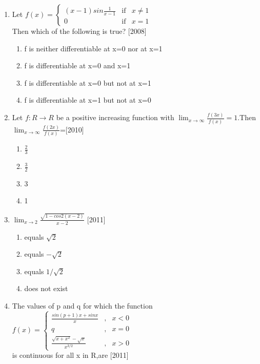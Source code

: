 \documentclass[journal,12pt,twocolumn]{IEEEtran}
\theoremstyle{remark}
\begin{document}
\begin{enumerate}
    \begin{enumerate}
        \item 0\item1\item 2\item -1
    \end{enumerate}
    \item[(25)] Let $f(x)= \left\{ \begin{array}{rcl}
(x-1)sin\frac{1}{x-1} & \mbox{if}
& x\neq 1 \\ 0 & \mbox{if} & x=1
\end{array}\right. $ \\Then which of the following is true? \hfill[2008]
    \begin{enumerate}
        \item f is neither differentiable at x=0 nor at x=1\item f is differentiable at x=0 and x=1\item f is differentiable at x=0 but not at x=1\item f is differentiable at x=1 but not at x=0
    \end{enumerate}
    \item[(26)] Let $f:R\rightarrow R$ be a positive increasing function with
    $\displaystyle \lim_{x\to\infty} \frac{f(3x)}{f(x)}=1 $.Then $\displaystyle \lim_{x\to\infty} \frac{f(2x)}{f(x)}$=\hfill[2010]
    \begin{enumerate}
     \item $\frac{2}{3}$ \item $\frac{3}{2}$ \item3 \item1
    \end{enumerate}
     \item[(27)]  $\displaystyle \lim_{x\to 2} \frac{\sqrt{1-cos{2(x-2)}}}{x-2} $ \hfill[2011]
    \begin{enumerate}
        \item equals $\sqrt{2}$ \item equals $-\sqrt{2}$ \item equals $1/\sqrt{2}$ \item does not exist
    \end{enumerate}
    \item[(28)] The values of p and q for which the function $f(x)= \left\{ \begin{array}{rcl}
\frac{sin(p+1)x+sinx}{x} & \mbox{,}
& x<0 \\ q & \mbox{,} & x=0 \\
 \frac{\sqrt{x+x^2}-\sqrt{x}}{x^{3/2}}& \mbox{,} & x>0
\end{array}\right. $ \\is  continuous for all x in R,are \hfill[2011]

\end{enumerate}
\end{document}
